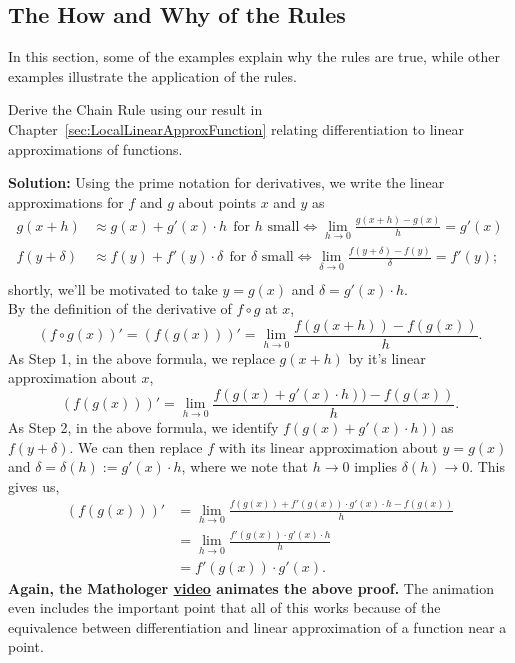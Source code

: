 \subsection{The How and Why of the Rules}

In this section, some of the examples explain why the rules are true, while other examples illustrate the application of the rules. 

\vspace*{.2cm}
\begin{example} 
\label{ex:deriveChainRule}
Derive the Chain Rule using our result in Chapter~\ref{sec:LocalLinearApproxFunction} relating differentiation to linear approximations of functions.
    
\end{example}
\textbf{Solution:} Using the prime notation for derivatives, we write the linear approximations for $f$ and $g$ about points $x$ and $y$ as
\begin{align*}
    g(x+h) &\approx g(x) + g'(x)\cdot h ~~\text{for $h$ small} \iff \lim_{h \to 0} \frac{g(x+h) - g(x)}{h} = g'(x) \\[1em]
    f(y+\delta) &\approx f(y) + f'(y)\cdot \delta ~~\text{for $\delta$ small} \iff \lim_{\delta \to 0} \frac{f(y+\delta) - f(y)}{\delta} = f'(y); \\
\end{align*}
shortly, we'll be motivated to take $y=g(x)$ and $\delta=g'(x)\cdot h$.\\

By the definition of the derivative of $f \circ g$ at $x$,
$$\left(f\circ g(x) \right)' = \left(f(g(x)) \right)' = \lim_{h \to 0} \frac{f(g(x+h)) - f(g(x))}{h} .$$
As Step 1, in the above formula, we replace $g(x+h)$ by it's linear approximation about $x$, 
$$\left(f(g(x)) \right)' = \lim_{h \to 0} \frac{f(g(x) + g'(x) \cdot h)) - f(g(x))}{h} .$$
As Step 2, in the above formula, we identify $f(g(x) + g'(x) \cdot h))$ as $f(y + \delta)$. We can then replace $f$ with its linear approximation about $y=g(x)$ and $\delta=\delta(h):=g'(x)\cdot h$, where we note that $h \to 0$ implies $\delta(h) \to 0$. This gives us,
\begin{align*}
    \left(f(g(x)) \right)' &= \lim_{h \to 0} \frac{f(g(x)) + f'(g(x)) \cdot g'(x) \cdot h - f(g(x))}{h} \\[1em]
    &  = \lim_{h \to 0} \frac{ f'(g(x)) \cdot g'(x) \cdot h }{h} \\[1em]
      &  =  f'(g(x)) \cdot g'(x) .
\end{align*}
{\bf Again, the Mathologer \href{https://youtu.be/kuOxDh3egN0?t=1669}{\bf video} animates the above proof.} The animation even includes the important point that all of this works because of the equivalence between differentiation and linear approximation of a function near a point.
\Qed

